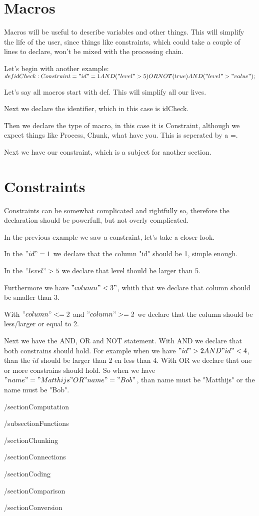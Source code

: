\documentclass[a4paper]{article}
\begin{document}
\section{Macros}
Macros will be useful to describe variables and other things. This will simplify the life of the user, since things like constraints, which could take a couple of lines to declare, won't be mixed with the processing chain.

Let's begin with another example: \\

$def idCheck : Constraint = "id" = 1 AND ("level" > 5) OR NOT(true) AND ("level" > "value");$

Let's say all macros start with def. This will simplify all our lives.

Next we declare the identifier, which in this case is idCheck.

Then we declare the type of macro, in this case it is Constraint, although we expect things like Process, Chunk, what have you. This is seperated by a =.

Next we have our constraint, which is a subject for another section.

\section{Constraints}
Constraints can be somewhat complicated and rightfully so, therefore the declaration should be powerfull, but not overly complicated.

In the previous example we saw a constraint, let's take a closer look.

In the $"id" = 1$ we declare that the column "id" should be 1, simple enough. 

In the $"level" > 5$ we declare that level thould be larger than 5. 

Furthermore we have $"column" < 3"$, whith that we declare that column should be smaller than 3.

With $"column" <= 2$ and $"column" >= 2$ we declare that the column should be less/larger or equal to 2.

Next we have the AND, OR and NOT statement. With AND we declare that both constrains should hold. For example when we have $"id" > 2 AND "id" < 4$, than the $id$ should be larger than 2 en less than 4.
With OR we declare that one or more constrains should hold. So when we have $"name" = "Matthijs" OR "name" = "Bob"$, than name must be "Matthijs" or the name must be "Bob".

/section{Computation}

/subsection{Functions}


/section{Chunking}

/section{Connections}

/section{Coding}

/section{Comparison}

/section{Conversion}
\end{document}
